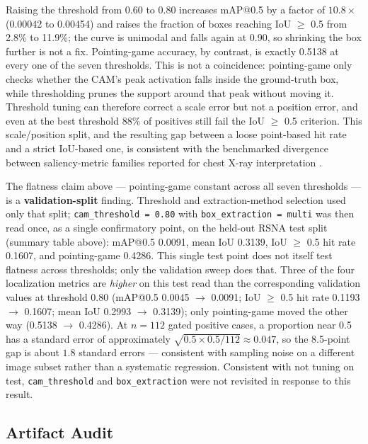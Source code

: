 Raising the threshold from 0.60 to 0.80 increases mAP@0.5 by a factor of $10.8\times$
(0.00042 to 0.00454) and raises the fraction of boxes reaching IoU $\geq$ 0.5 from 2.8\%
to 11.9\%; the curve is unimodal and falls again at 0.90, so shrinking the box further
is not a fix. Pointing-game accuracy, by contrast, is exactly 0.5138 at every one of the
seven thresholds. This is not a coincidence: pointing-game only checks whether the CAM's
peak activation falls inside the ground-truth box, while thresholding prunes the support
around that peak without moving it. Threshold tuning can therefore correct a scale
error but not a position error, and even at the best threshold 88\% of positives still
fail the IoU $\geq$ 0.5 criterion. This scale/position split, and the resulting gap
between a loose point-based hit rate and a strict IoU-based one, is consistent with the
benchmarked divergence between saliency-metric families reported for chest X-ray
interpretation \citep{saporta2022benchmarking}.

The flatness claim above — pointing-game constant across all seven thresholds — is a
\textbf{validation-split} finding. Threshold and extraction-method selection used only
that split; \texttt{cam\_threshold = 0.80} with \texttt{box\_extraction = multi} was
then read once, as a single confirmatory point, on the held-out RSNA test split (summary
table above): mAP@0.5 0.0091, mean IoU 0.3139, IoU $\geq$ 0.5 hit rate 0.1607, and
pointing-game 0.4286. This single test point does not itself test flatness across
thresholds; only the validation sweep does that. Three of the four localization metrics
are \emph{higher} on this test read than the corresponding validation values at
threshold 0.80 (mAP@0.5 0.0045 $\to$ 0.0091; IoU $\geq$ 0.5 hit rate 0.1193 $\to$
0.1607; mean IoU 0.2993 $\to$ 0.3139); only pointing-game moved the other way (0.5138
$\to$ 0.4286). At $n = 112$ gated positive cases, a proportion near 0.5 has a standard
error of approximately $\sqrt{0.5 \times 0.5 / 112} \approx 0.047$, so the 8.5-point gap
is about $1.8$ standard errors — consistent with sampling noise on a different image
subset rather than a systematic regression. Consistent with not tuning on test,
\texttt{cam\_threshold} and \texttt{box\_extraction} were not revisited in response to
this result.

\subsection{Artifact Audit}

